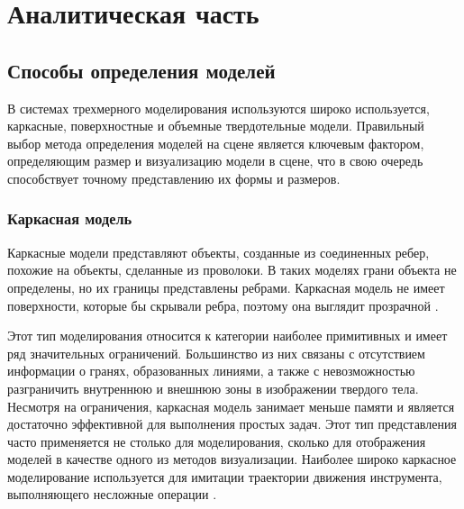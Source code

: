 \chapter{Аналитическая часть}

\section{Способы определения моделей}

В системах трехмерного моделирования используются широко используется, каркасные, поверхностные и объемные твердотельные модели. Правильный выбор метода определения моделей на сцене является ключевым фактором, определяющим размер и визуализацию модели в сцене, что в свою очередь способствует точному представлению их формы и размеров.

\subsection{Каркасная модель}
Каркасные модели представляют объекты, созданные из соединенных
ребер, похожие на объекты, сделанные из проволоки. В таких моделях грани объекта не определены, но их границы представлены ребрами. Каркасная модель не имеет поверхности, которые бы скрывали ребра, поэтому она выглядит прозрачной \cite{model_geom}.

Этот тип моделирования относится к категории наиболее примитивных и имеет ряд значительных ограничений. Большинство из них связаны с отсутствием информации о гранях, образованных линиями, а также с невозможностью разграничить внутреннюю и внешнюю зоны в изображении твердого тела. Несмотря на ограничения, каркасная модель занимает меньше памяти и является достаточно эффективной для выполнения простых задач. Этот тип представления часто применяется не столько для моделирования, сколько для отображения моделей в качестве одного из методов визуализации. Наиболее широко каркасное моделирование используется для имитации траектории движения инструмента, выполняющего несложные операции \cite{model_geom_01}.

